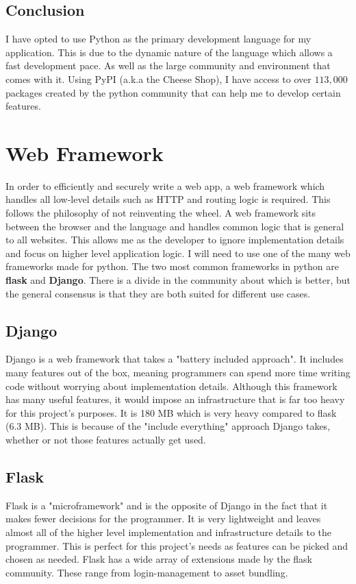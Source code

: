 \documentclass[a4paper,oneside,12pt]{report}
\begin{document}
	\subsection{Conclusion}
	I have opted to use Python as the primary development language for my application. This is due to the dynamic nature of the language which allows a 
	fast development pace. As well as the large community and environment that comes with it. Using PyPI (a.k.a the Cheese Shop), I have access to over \(113,000\) packages created by the python community that can help me to develop certain features. 

	\section{Web Framework}
	In order to efficiently and securely write a web app, a web framework which handles all low-level details such as HTTP and routing logic is required. This follows the philosophy of not reinventing the wheel. A web framework sits between the browser and the language and handles common logic that is general to all websites. This allows me as the developer to ignore implementation details and focus on higher level application logic. I will need to use one of the many web frameworks made for python. The two most common frameworks in python are \textbf{flask} and \textbf{Django}. There is a divide in the community about which is better, but the general consensus is that they are both suited for different use cases.

	\subsection{Django}
	Django is a web framework that takes a "battery included approach". It includes many features out of the box, meaning programmers can spend more time writing code without worrying about implementation details. Although this framework has many useful features, it would impose an infrastructure that is far too heavy for this project's purposes. It is 180 MB which is very heavy compared to flask (6.3 MB). This is because of the "include everything" approach Django takes, whether or not those features actually get used.

	\subsection{Flask}
	Flask is a "microframework" and is the opposite of Django in the fact that it makes fewer decisions for the programmer. It is very lightweight and leaves almost all of the higher level implementation and infrastructure details to the programmer. This is perfect for this project's needs as features can be picked and chosen as needed. Flask has a wide array of extensions made by the flask community. These range from login-management to asset bundling.
	
\end{document}
